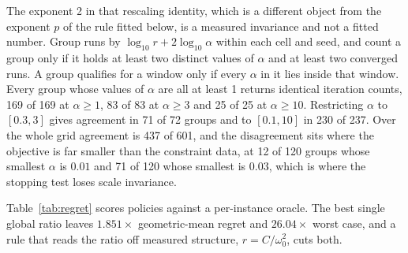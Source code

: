 The exponent 2 in that rescaling identity, which is a different object from the
exponent $p$ of the rule fitted below, is a measured invariance and not a
fitted number. Group runs by
$\log_{10} r + 2 \log_{10} \alpha$ within each cell and seed, and count a group
only if it holds at least two distinct values of $\alpha$ and at least two
converged runs. A group qualifies for a window only if every $\alpha$ in it
lies inside that window. Every group whose values of $\alpha$ are all at least
1 returns identical iteration counts, 169 of 169 at $\alpha \geq 1$, 83 of 83 at
$\alpha \geq 3$ and 25 of 25 at $\alpha \geq 10$. Restricting $\alpha$ to
$[0.3, 3]$ gives agreement in 71 of 72 groups and to $[0.1, 10]$ in 230 of 237.
Over the whole grid agreement is 437 of 601, and the disagreement sits where
the objective is far smaller than the constraint data, at 12 of 120 groups
whose smallest $\alpha$ is $0.01$ and 71 of 120 whose smallest is $0.03$, which
is where the stopping test loses scale invariance.

Table~\ref{tab:regret} scores policies against a per-instance oracle. The best
single global ratio leaves $1.851\times$ geometric-mean regret and $26.04\times$
worst case, and a rule that reads the ratio off measured structure,
$r = C / \omega_0^2$, cuts both.

